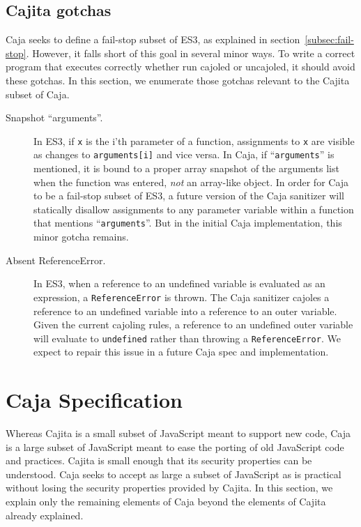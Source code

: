 \documentclass[letterpaper,twocolumn,10pt]{article}
\newcommand{\code}[1]{{\tt {#1}}}              %
\begin{document}
\subsection{Cajita gotchas}
\label{subsec:cajita-gotcha}

Caja seeks to define a fail-stop subset of ES3, as explained in section~\ref{subsec:fail-stop}. However, 
it falls short of this goal in several minor ways. To write a correct program 
that executes correctly whether run cajoled or uncajoled, it should 
avoid these gotchas. In this section, we enumerate those gotchas relevant to 
the Cajita subset of Caja.

\begin{description}

  \item[Snapshot ``arguments''.] In ES3, if \code{x} is the i'th parameter of 
  a function, assignments to \code{x} are visible as changes to 
  \code{arguments[i]} and vice versa. In Caja, if ``\code{arguments}'' is mentioned, it is 
  bound to a proper array snapshot of the arguments list when the function 
  was entered, \emph{not} an array-like object. In order for Caja to be a 
  fail-stop subset of ES3, a future version of the Caja sanitizer will 
  statically disallow assignments to any parameter variable within a function 
  that mentions ``\code{arguments}''. But in the initial Caja implementation, 
  this minor gotcha remains.
  
  \item[Absent ReferenceError.] In ES3, when a reference to an undefined 
  variable is evaluated as an expression, a \code{ReferenceError} is thrown. 
  The Caja sanitizer cajoles a reference to an undefined variable into a 
  reference to an outer variable. Given the current cajoling rules, a 
  reference to an undefined outer variable will evaluate to \code{undefined} 
  rather than throwing a \code{ReferenceError}. We expect to repair this 
  issue in a future Caja spec and implementation.
    
\end{description}

\section{Caja Specification}
\label{sec:caja-spec}

Whereas Cajita is a small subset of JavaScript meant to support new code, 
Caja is a large subset of JavaScript meant to ease the porting of old 
JavaScript code and practices. Cajita is small enough that its security 
properties can be understood. Caja seeks to accept as large a subset of 
JavaScript as is practical without losing the security properties provided by 
Cajita. In this section, we explain only the remaining elements of Caja 
beyond the elements of Cajita already explained.
\end{document}
